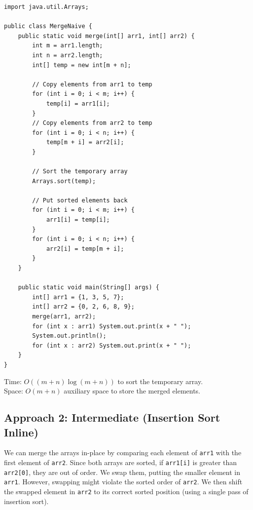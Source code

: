 \documentclass[12pt,a4paper,oneside]{book}
\begin{document}
\begin{lstlisting}[caption={Merge Without Extra Space --- Naive Auxiliary Array \& Sort, O((m+n) log(m+n)) time O(m+n) space}]
import java.util.Arrays;

public class MergeNaive {
    public static void merge(int[] arr1, int[] arr2) {
        int m = arr1.length;
        int n = arr2.length;
        int[] temp = new int[m + n];

        // Copy elements from arr1 to temp
        for (int i = 0; i < m; i++) {
            temp[i] = arr1[i];
        }
        // Copy elements from arr2 to temp
        for (int i = 0; i < n; i++) {
            temp[m + i] = arr2[i];
        }

        // Sort the temporary array
        Arrays.sort(temp);

        // Put sorted elements back
        for (int i = 0; i < m; i++) {
            arr1[i] = temp[i];
        }
        for (int i = 0; i < n; i++) {
            arr2[i] = temp[m + i];
        }
    }

    public static void main(String[] args) {
        int[] arr1 = {1, 3, 5, 7};
        int[] arr2 = {0, 2, 6, 8, 9};
        merge(arr1, arr2);
        for (int x : arr1) System.out.print(x + " ");
        System.out.println();
        for (int x : arr2) System.out.print(x + " ");
    }
}
\end{lstlisting}

\begin{complexity}
Time: $O((m+n) \log (m+n))$ to sort the temporary array.\\
Space: $O(m+n)$ auxiliary space to store the merged elements.
\end{complexity}

\subsection{Approach 2: Intermediate (Insertion Sort Inline)}
We can merge the arrays in-place by comparing each element of \texttt{arr1} with the first element of \texttt{arr2}. Since both arrays are sorted, if \texttt{arr1[i]} is greater than \texttt{arr2[0]}, they are out of order. We swap them, putting the smaller element in \texttt{arr1}. However, swapping might violate the sorted order of \texttt{arr2}. We then shift the swapped element in \texttt{arr2} to its correct sorted position (using a single pass of insertion sort).
\end{document}
